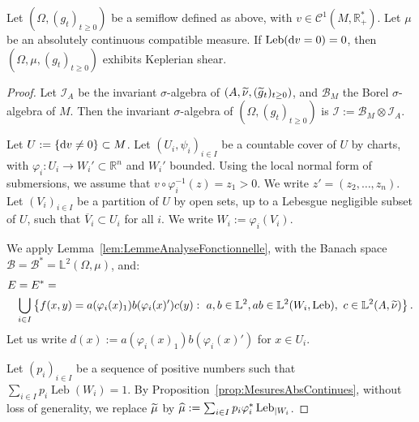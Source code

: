 \documentclass[AHL,Unicode,longabstracts]{cedram}
\DeclareMathOperator{\Leb}{Leb}
\newcommand{\R}{\mathbb{R}}
\newcommand{\Lbb}{\mathbb{L}}
\newcommand{\Bcal}{\mathcal{B}}
\newcommand{\Ccal}{\mathcal{C}}
\newcommand{\Ical}{\mathcal{I}}
\newcommand{\de}{{\rm d}}
\let\oldtilde\tilde
\renewcommand*{\tilde}[1]{\mathchoice{\widetilde{#1}}{\widetilde{#1}}{\oldtilde{#1}}{\oldtilde{#1}}}\let\oldhat\hat
\renewcommand*{\hat}[1]{\mathchoice{\widehat{#1}}{\widehat{#1}}{\oldhat{#1}}{\oldhat{#1}}}\let\oldforall\forall
\renewcommand*{\forall}{\mathrel{\oldforall}}
\begin{document}
\begin{theo}\label{thm:CisaillementSuspensions}

Let $(\Omega, (g_t)_{t \geq 0})$ be a semiflow defined as above, with $v \in \Ccal^1 (M, \R_+^*)$. Let $\mu$ be an absolutely continuous compatible measure. If $\Leb (\de v=0)\linebreak=0$, then $(\Omega, \mu, (g_t)_{t \geq 0})$ exhibits Keplerian shear.
\end{theo}



\begin{proof}
Let $\Ical_A$ be the invariant $\sigma$-algebra of $(A, \tilde{\nu}, (\tilde{g}_t)_{t \geq 0})$, and $\Bcal_M$ the Borel $\sigma$-algebra of $M$. Then the invariant $\sigma$-algebra of $(\Omega, (g_t)_{t \geq 0})$ is $\Ical := \Bcal_M \otimes \Ical_A$.


Let $U := \{\de v \neq 0\} \subset M$. Let $(U_i, \psi_i)_{i \in I}$ be a countable cover of $U$ by charts, with $\varphi_i : U_i \to W_i' \subset \R^n$ and $W_i'$ bounded. Using the local normal form of submersions, we assume that $v \circ \varphi_i^{-1} (z) = z_1>0$. We write $z' = (z_2, \ldots, z_n)$. Let $(V_i)_{i \in I}$ be a partition of $U$ by open sets, up to a Lebesgue negligible subset of $U$, such that $\overline{V}_i \subset U_i$ for all $i$. We write $W_i := \varphi_i (V_i)$.


We apply Lemma~\ref{lem:LemmeAnalyseFonctionnelle}, with the Banach space $\Bcal = \Bcal^* = \Lbb^2 (\Omega, \mu)$, and:
\begin{align*}
E & = E^* = \\
& \bigcup_{i \in I} \left\{f(x,y)=a (\varphi_i (x)_1) b (\varphi_i (x)') c(y) : \ a, b \in \Lbb^2, ab \in \Lbb^2 (W_i, \Leb), \ c \in \Lbb^2 (A, \tilde{\nu}) \right\}.
\end{align*}
Let us write $d(x):= a(\varphi_i (x)_1) b(\varphi_i (x)')$ for $x \in U_i$.


Let $(p_i)_{i \in I}$ be a sequence of positive numbers such that $\sum_{i \in I} p_i \Leb (W_i) = 1$. By Proposition~\ref{prop:MesuresAbsContinues}, without loss of generality, we replace $\tilde{\mu}$ by $\hat{\mu} := \sum_{i \in I} p_i \varphi_i^* \Leb_{|W_i}$.



\end{proof}
\end{document}
